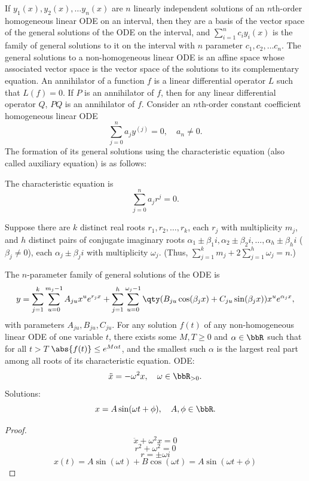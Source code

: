 \documentclass[a4paper,12pt]{report}
\begin{document}
If $y_1(x),y_2(x),\ldots y_n(x)$ are $n$ linearly independent solutions of an $n$th-order homogeneous linear ODE on an interval, then they are a basis of the vector space of the general solutions of the ODE on the interval, and $\sum_{i=1}^nc_iy_i(x)$ is the family of general solutions to it on the interval with $n$ parameter $c_1,c_2,\ldots c_n$.
The general solutions to a non-homogeneous linear ODE is an affine space whose associated vector space is the vector space of the solutions to its complementary equation.
An annihilator of a function $f$ is a linear differential operator $L$ such that $L(f)=0$.
If $P$ is an annihilator of $f$, then for any linear differential operator $Q$, $PQ$ is an annihilator of $f$.
Consider an $n$th-order constant coefficient homogeneous linear ODE
\[\sum_{j=0}^na_jy^{(j)}=0,\quad a_n\neq 0.\]
The formation of its general solutions using the characteristic equation (also called auxiliary equation) is as follows:
\ben
\item The characteristic equation is
\[\sum_{j=0}^na_jr^j=0.\]
\item Suppose there are $k$ distinct real roots $r_1,r_2,\ldots,r_k$, each $r_j$ with multiplicity $m_j$, and $h$ distinct pairs of conjugate imaginary roots $\alpha_1\pm\beta_1i,\alpha_2\pm\beta_2i,\ldots,\alpha_h\pm\beta_hi$ ($\beta_j\neq 0$), each $\alpha_j\pm\beta_ji$ with multiplicity $\omega_j$. (Thus, $\sum_{j=1}^km_j+2\sum_{j=1}^h\omega_j=n$.)
\item The $n$-parameter family of general solutions of the ODE is
\[y=\sum_{j=1}^k\sum_{u=0}^{m_j-1}A_{ju}x^ue^{r_jx}+\sum_{j=1}^h\sum_{u=0}^{\omega_j-1}\qty(B_{ju}\cos(\beta_jx)+C_{ju}\sin(\beta_jx))x^ue^{\alpha_jx},\]
with parameters $A_{ju},B_{ju},C_{ju}$.
\een
{}
For any solution $f(t)$ of any non-homogeneous linear ODE of one variable $t$, there exists some $M,T\geq 0$ and $\alpha\in\bbR$ such that for all $t>T$ $\abs{f(t)}\leq e^{M\alpha t}$, and the smallest such $\alpha$ is the largest real part among all roots of its characteristic equation.
ODE:
\[\ddot{x}=-\omega^2x,\quad\omega\in\bbR_{>0}.\]
Solutions:
\[x=A\sin(\omega t+\phi),\quad A,\phi\in\bbR.\]
\begin{proof}
\[\ddot{x}+\omega^2x=0\]
\[r^2+\omega^2=0\]
\[r=\pm\omega i\]
\[x(t)=A\sin(\omega t)+B\cos(\omega t)=A\sin(\omega t+\phi)\]
\end{proof}
\end{document}

